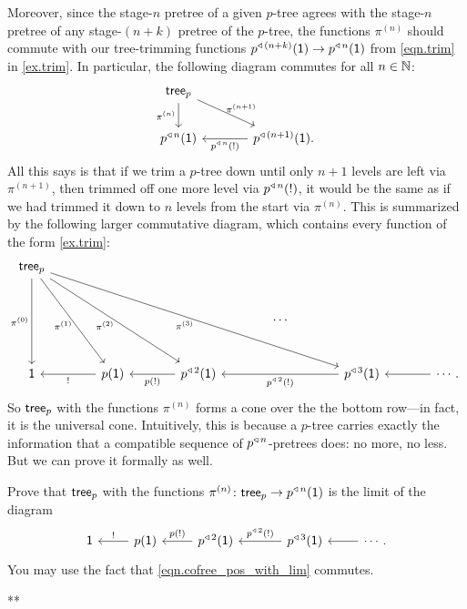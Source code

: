 \documentclass[Book-Poly]{subfiles}
\begin{document}
Moreover, since the stage-$n$ pretree of a given $p$-tree agrees with the stage-$n$ pretree of any stage-$(n+k)$ pretree of the $p$-tree, the functions $\pi^{(n)}$ should commute with our tree-trimming functions $p^{\mathbin{\triangleleft}\,(n+k)}(\textsf{1})\to p^{\mathbin{\triangleleft}\,n}(\textsf{1})$ from \eqref{eqn.trim} in \cref{ex.trim}.
In particular, the following diagram commutes for all $n\in\mathbb{N}$:
\[
\begin{tikzcd}[column sep=large]
    \tr_p \ar[d,"\pi^{(n)}"'] \ar[dr,"\pi^{(n+1)}",outer sep=-2pt] \\
    p\tripow{n}(\1) & p\tripow{(n+1)}(\1). \ar[l,"p\tripow{n}(!)"]
\end{tikzcd}
\]
All this says is that if we trim a $p$-tree down until only $n+1$ levels are left via $\pi^{(n+1)}$, then trimmed off one more level via $p^{\mathbin{\triangleleft}\,n}(!)$, it would be the same as if we had trimmed it down to $n$ levels from the start via $\pi^{(n)}$.
This is summarized by the following larger commutative diagram, which contains every function of the form \cref{ex.trim}:
\begin{equation} \label{eqn.cofree_pos_with_lim}
\begin{tikzcd}[sep=large]
    \tr_p \ar[dd,"\pi^{(0)}"'] \ar[ddr,"\pi^{(1)}"',outer sep=-2pt] \ar[ddrr,"\pi^{(2)}"',outer sep=-1.5pt] \ar[ddrrrr,"\pi^{(3)}"',outer sep=-1.5pt]\\
    &&&\cdots\\
    \1 &
	p(\1) \ar[l, "!"] &
	p\tripow2(\1) \ar[l, "p(!)"] &&
	p\tripow3(\1) \ar[ll, "p\tripow2(!)"] &
	\cdots.\ar[l]
\end{tikzcd}
\end{equation}
So $\mathsf{tree}_p$ with the functions $\pi^{(n)}$ forms a cone over the the bottom row---in fact, it is the universal cone.
Intuitively, this is because a $p$-tree carries exactly the information that a compatible sequence of $p^{\mathbin{\triangleleft}\,n}$-pretrees does: no more, no less.
But we can prove it formally as well.

\begin{exercise}
Prove that $\mathsf{tree}_p$ with the functions $\pi^{(n)}\colon\mathsf{tree}_p\to p^{\mathbin{\triangleleft}\,n}(\textsf{1})$ is the limit of the diagram
\begin{equation} \label{eqn.cofree_pos_diagram}
\begin{tikzcd}
    \1 &
	p(\1) \ar[l, "!"'] &
	p\tripow2(\1) \ar[l, "p(!)"'] &
 	[10pt]
	p\tripow3(\1) \ar[l, "p\tripow2(!)"'] &
	\cdots.\ar[l]
\end{tikzcd}
\end{equation}
You may use the fact that \eqref{eqn.cofree_pos_with_lim} commutes.
\begin{solution}
**
\end{solution}
\end{exercise}
\end{document}
